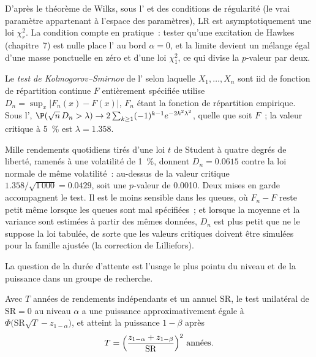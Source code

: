 D'après le théorème de Wilks, sous l' et des conditions de régularité (le vrai paramètre appartenant à l'espace des paramètres), $\mathrm{LR}$ est
asymptotiquement une loi $\chi^2_r$. La condition compte en pratique~: tester qu'une excitation de Hawkes (chapitre~7) est nulle place
l' au bord $\alpha = 0$, et la limite devient un mélange égal d'une masse ponctuelle en zéro et d'une loi $\chi^2_1$, ce qui divise
la $p$-valeur par deux.

\begin{definition}\label{def:qm:testing-and-multiple-testing:ks}
Le \emph{test de Kolmogorov--Smirnov} de l' selon laquelle $X_1, \dots, X_n$ sont iid de fonction de répartition continue $F$ entièrement
spécifiée utilise $D_n = \sup_x|F_n(x) - F(x)|$, $F_n$ étant la fonction de répartition empirique. Sous l', $\P(\sqrt n\,D_n > \lambda)
\to 2\sum_{k \ge 1}(-1)^{k-1}e^{-2k^2\lambda^2}$, quelle que soit $F$~; la valeur critique à 5~\% est $\lambda = 1.358$.
\end{definition}

Mille rendements quotidiens tirés d'une loi $t$ de Student à quatre degrés de liberté, ramenés à une volatilité de 1~\%, donnent $D_n = 0.0615$
contre la loi normale de même volatilité~: au-dessus de la valeur critique $1.358/\sqrt{1\,000} = 0.0429$, soit une $p$-valeur de
0.0010. Deux mises en garde accompagnent le test. Il est le moins sensible dans les queues, où $F_n - F$ reste petit même lorsque les queues sont mal spécifiées~;
et lorsque la moyenne et la variance sont estimées à partir des mêmes données, $D_n$ est plus petit que ne le suppose la loi tabulée, de sorte que les
valeurs critiques doivent être simulées pour la famille ajustée (la correction de Lilliefors).

La question de la durée d'attente est l'usage le plus pointu du niveau et de la puissance dans un groupe de recherche.

\begin{proposition}\label{prop:qm:testing-and-multiple-testing:years}
Avec $T$ années de rendements indépendants et un  annuel $\mathrm{SR}$, le test unilatéral de $\mathrm{SR} = 0$ au niveau
$\alpha$ a une puissance approximativement égale à $\Phi\bigl(\mathrm{SR}\sqrt T - z_{1-\alpha}\bigr)$, et atteint la puissance $1 - \beta$ après
\[
T = \Bigl(\frac{z_{1-\alpha} + z_{1-\beta}}{\mathrm{SR}}\Bigr)^2 \text{ années}.
\]
\end{proposition}

